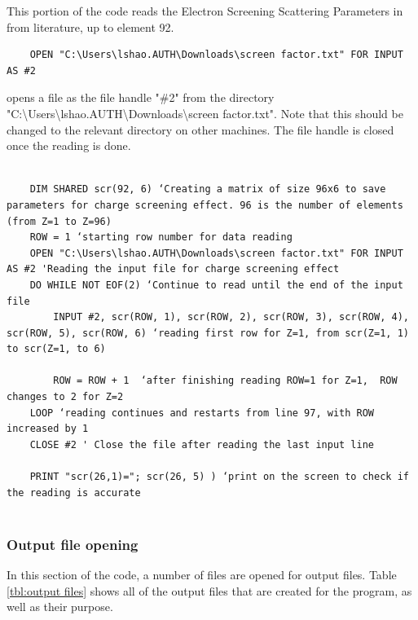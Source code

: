 \documentclass[10pt, reqno]{exam}
\begin{document}
{This portion of the code reads the Electron Screening Scattering Parameters in from literature, up to element 92. \par

\vspace{0.5 cm}

\begin{verbatim}
    OPEN "C:\Users\lshao.AUTH\Downloads\screen factor.txt" FOR INPUT AS #2
\end{verbatim}

opens a file as the file handle "\#2" from the directory "C:\textbackslash Users\textbackslash lshao.AUTH\textbackslash Downloads\textbackslash screen factor.txt". Note that this should be changed to the relevant directory on other machines. The file handle is closed once the reading is done.

\begin{verbatim}

    DIM SHARED scr(92, 6) ‘Creating a matrix of size 96x6 to save parameters for charge screening effect. 96 is the number of elements (from Z=1 to Z=96)
    ROW = 1 ‘starting row number for data reading
    OPEN "C:\Users\lshao.AUTH\Downloads\screen factor.txt" FOR INPUT AS #2 'Reading the input file for charge screening effect
    DO WHILE NOT EOF(2) ‘Continue to read until the end of the input file
        INPUT #2, scr(ROW, 1), scr(ROW, 2), scr(ROW, 3), scr(ROW, 4), scr(ROW, 5), scr(ROW, 6) ‘reading first row for Z=1, from scr(Z=1, 1) to scr(Z=1, to 6)
    
        ROW = ROW + 1  ‘after finishing reading ROW=1 for Z=1,  ROW changes to 2 for Z=2
    LOOP ‘reading continues and restarts from line 97, with ROW increased by 1
    CLOSE #2 ' Close the file after reading the last input line
    
    PRINT "scr(26,1)="; scr(26, 5) ) ‘print on the screen to check if the reading is accurate
    
\end{verbatim}
\subsubsection{Output file opening}

In this section of the code, a number of files are opened for output files. Table \ref{tbl:output files} shows all of the output files that are created for the program, as well as their purpose.

}
\end{document}
